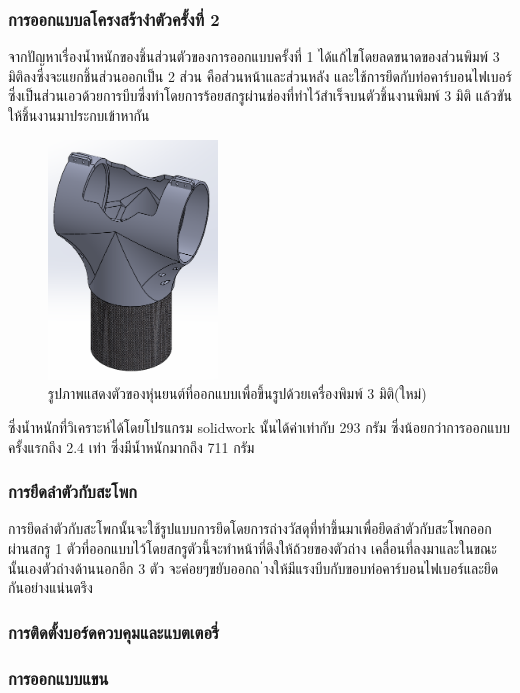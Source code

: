 \subsubsection{การออกแบบลโครงสร้างำตัวครั้งที่ 2}
จากปัญหาเรื่องน้ำหนักของชิ้นส่วนตัวของการออกแบบครั้งที่ 1 ได้แก้ไขโดยลดขนาดของส่วนพิมพ์ 3 มิติลงซึ่งจะแยกชิ้นส่วนออกเป็น 2 ส่วน คือส่วนหน้าและส่วนหลัง
และใช้การยึดกับท่อคาร์บอนไฟเบอร์ซึ่งเป็นส่วนเอวด้วยการบีบซึ่งทำโดยการร้อยสกรูผ่านช่องที่ทำไว้สำเร็จบนตัวชิ้นงานพิมพ์ 3 มิติ แล้วขันให้ชิ้นงานมาประกบเข้าหากัน
\begin{figure}[h!]
  \centering
  \includegraphics[width=0.4\textwidth]{chapter4/images/troso_new.PNG}
  \caption{รูปภาพแสดงตัวของหุ่นยนต์ที่ออกแบบเพื่อขึ้นรูปด้วยเครื่องพิมพ์ 3 มิติ(ใหม่)}
  \label{fig:torso_new}
\end{figure}
ซึ่งน้ำหนักที่วิเคราะห์ได้โดยโปรแกรม solidwork นั้นได้ค่าเท่ากับ 293 กรัม ซึ่งน้อยกว่าการออกแบบครั้งแรกถึง 2.4 เท่า ซึ่งมีน้ำหนักมากถึง 711 กรัม
\subsubsection*{การยึดลำตัวกับสะโพก}
การยึดลำตัวกับสะโพกนั้นจะใช้รูปแบบการยึดโดยการถ่างวัสดุที่ทำขึ้นมาเพื่อยึดลำตัวกับสะโพกออกผ่านสกรู 1 ตัวที่ออกแบบไว้โดยสกรูตัวนี้จะทำหน้าที่ดึงให้ถ้วยของตัวถ่าง
เคลื่อนที่ลงมาและในขณะนั้นเองตัวถ่างด้านนอกอีก 3 ตัว จะค่อยๆขยับออกถ ่างให้มีแรงบีบกับขอบท่อคาร์บอนไฟเบอร์และยึดกันอย่างแน่นตรึง

\subsubsection*{การติดตั้งบอร์ดควบคุมและแบตเตอรี่}

\subsubsection{การออกแบบแขน}



